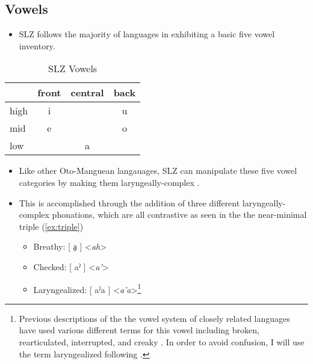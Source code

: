 \documentclass[12pt, letterpaper]{article}
\providecommand{\lsptoprule}{\midrule\toprule}
\providecommand{\lspbottomrule}{\bottomrule\midrule}
\begin{document}
\subsection{Vowels}\label{sec:Vowel}
\begin{itemize}
	\item SLZ follows the majority of languages in exhibiting a basic five vowel inventory.
\end{itemize}

\begin{table}[!h]
\centering
\caption{SLZ Vowels}
\label{tab:vow}
 \begin{tabular}{lccc}
  \lsptoprule
            &  front& central  & back \\
  \midrule
	high   	&  i  &     &   u \\
	mid    	&  e  &   	& 	o \\
	low   	&     &  a 	&	  \\
  \lspbottomrule
 \end{tabular}
\end{table}

\begin{itemize}
	\item Like other Oto-Manguean langauages, SLZ can manipulate these five vowel categories by making them laryngeally-complex \citep{silvermanLaryngealComplexityOtomanguean1997}.

	\item This is accomplished through the addition of three different laryngeally-complex phonations, which are all contrastive as seen in the the near-minimal triple (\ref{ex:triple})
		\begin{itemize}
			\item Breathy: [ a̤ ] <\textit{ah}> 
			\item Checked: [ aˀ ] <\textit{a'}>
			\item Laryngealized: [ aˀa ] <\textit{a'a}>\footnote{Previous descriptions of the the vowel system of closely related languages have used various different terms for this vowel including broken, rearticulated, interrupted, and creaky \citep{longDiccionarioZapotecoSan2005,avelinoAcousticElectroglottographicAnalyses2010,avelinobecerraTopicsYalalagZapotec2004,sonnenscheinDescriptiveGrammarSan2005,adlerAcousticsPhonationTypes2016}. In order to avoid confusion, I will use the term laryngealized following \citet{avelinoAcousticElectroglottographicAnalyses2010}.}
		\end{itemize}
\end{itemize}
\end{document}
